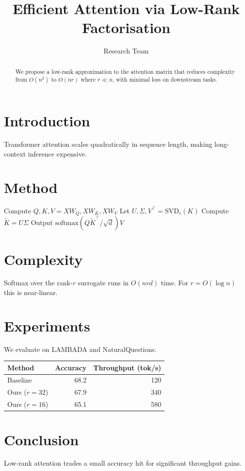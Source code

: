 \documentclass{article}
\title{Efficient Attention via Low-Rank Factorisation}
\author{Research Team}
\begin{document}
\maketitle

\begin{abstract}
We propose a low-rank approximation to the attention matrix that reduces complexity from $O(n^2)$ to $O(nr)$ where $r \ll n$, with minimal loss on downstream tasks.
\end{abstract}

\section{Introduction}
Transformer attention scales quadratically in sequence length, making long-context inference expensive.

\section{Method}

\begin{algorithm}
\caption{Low-rank attention}
\begin{algorithmic}[1]
\State Compute $Q, K, V = XW_Q, XW_K, XW_V$
\State Let $U, \Sigma, V^\top = \text{SVD}_r(K)$ 
\State Compute $\tilde K = U\Sigma$
\State Output $\text{softmax}(Q\tilde K^\top / \sqrt{d}) V$
\end{algorithmic}
\end{algorithm}

\section{Complexity}
Softmax over the rank-$r$ surrogate runs in $O(nrd)$ time. For $r = O(\log n)$ this is near-linear.

\section{Experiments}
We evaluate on LAMBADA and NaturalQuestions.

\begin{tabular}{lrr}
  \toprule
  Method & Accuracy & Throughput (tok/s) \\
  \midrule
  Baseline & 68.2 & 120 \\
  Ours ($r=32$) & 67.9 & 340 \\
  Ours ($r=16$) & 65.1 & 580 \\
  \bottomrule
\end{tabular}

\section{Conclusion}
Low-rank attention trades a small accuracy hit for significant throughput gains.
\end{document}
